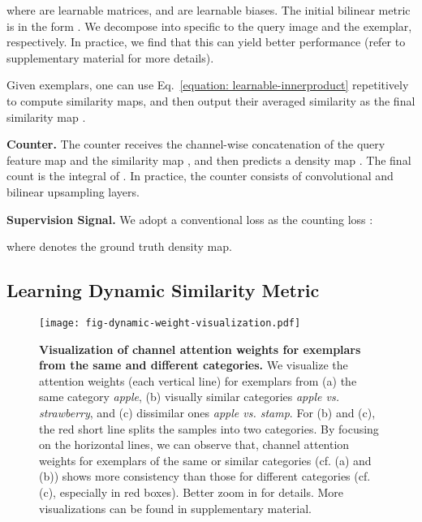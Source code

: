 \documentclass[10pt,twocolumn,letterpaper]{article}
\newcommand{\margin}{\vspace{3pt}\noindent}
\begin{document}
where  are learnable matrices, and  are learnable biases. The initial bilinear metric is in the form . We decompose  into  specific to the query image and the exemplar, respectively. In practice, we find that this can yield better performance (refer to supplementary material for more details). 

Given  exemplars, one can use Eq.~\ref{equation: learnable-innerproduct} repetitively to compute  similarity maps, and then output their averaged similarity as the final similarity map .

\margin
\textbf{Counter.}
The counter receives the channel-wise concatenation of the query feature map  and the similarity map , and then predicts a density map . The final count is the integral of . In practice, the counter consists of convolutional and bilinear upsampling layers.

\margin
\textbf{Supervision Signal.}
We adopt a conventional  loss as the counting loss :

where  denotes the ground truth density map. 


\subsection{Learning Dynamic Similarity Metric}
\label{sec:dynamic-similarity-metric}
\begin{figure}[!t]
  \centering 
   \texttt{[image: fig-dynamic-weight-visualization.pdf]}\vspace{-10pt}
   \caption{\textbf{Visualization of channel attention weights for exemplars from the same and different categories.}
   We visualize the attention weights (each vertical line) for exemplars from (a) the same category \textit{apple}, (b) visually similar categories \textit{apple vs. strawberry}, and (c) dissimilar ones \textit{apple vs. stamp}. For (b) and (c), the red short line splits the samples into two categories. By focusing on the horizontal lines, we can observe that, channel attention weights for exemplars of the same or similar categories (cf. (a) and (b)) shows more consistency than those for different categories (cf. (c), especially in red boxes). Better zoom in for details. More visualizations can be found in supplementary material.}
   \label{fig:dynamic-weight-visualization}
   \vspace{-5pt}
\end{figure}
\end{document}
